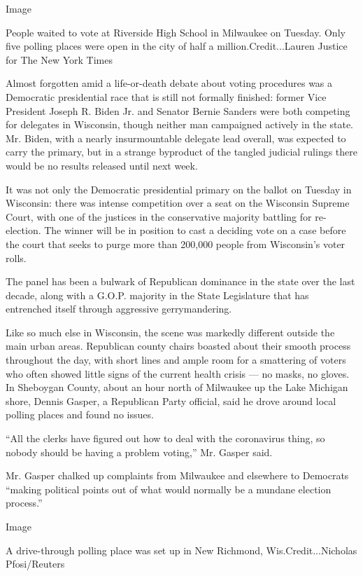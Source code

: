 Image

People waited to vote at Riverside High School in Milwaukee on Tuesday.
Only five polling places were open in the city of half a
million.Credit...Lauren Justice for The New York Times

Almost forgotten amid a life-or-death debate about voting procedures was
a Democratic presidential race that is still not formally finished:
former Vice President Joseph R. Biden Jr. and Senator Bernie Sanders
were both competing for delegates in Wisconsin, though neither man
campaigned actively in the state. Mr. Biden, with a nearly
insurmountable delegate lead overall, was expected to carry the primary,
but in a strange byproduct of the tangled judicial rulings there would
be no results released until next week.

It was not only the Democratic presidential primary on the ballot on
Tuesday in Wisconsin: there was intense competition over a seat on the
Wisconsin Supreme Court, with one of the justices in the conservative
majority battling for re-election. The winner will be in position to
cast a deciding vote on a case before the court that seeks to purge more
than 200,000 people from Wisconsin's voter rolls.

The panel has been a bulwark of Republican dominance in the state over
the last decade, along with a G.O.P. majority in the State Legislature
that has entrenched itself through aggressive gerrymandering.

Like so much else in Wisconsin, the scene was markedly different outside
the main urban areas. Republican county chairs boasted about their
smooth process throughout the day, with short lines and ample room for a
smattering of voters who often showed little signs of the current health
crisis --- no masks, no gloves. In Sheboygan County, about an hour north
of Milwaukee up the Lake Michigan shore, Dennis Gasper, a Republican
Party official, said he drove around local polling places and found no
issues.

``All the clerks have figured out how to deal with the coronavirus
thing, so nobody should be having a problem voting,'' Mr. Gasper said.

Mr. Gasper chalked up complaints from Milwaukee and elsewhere to
Democrats ``making political points out of what would normally be a
mundane election process.''

Image

A drive-through polling place was set up in New Richmond,
Wis.Credit...Nicholas Pfosi/Reuters

